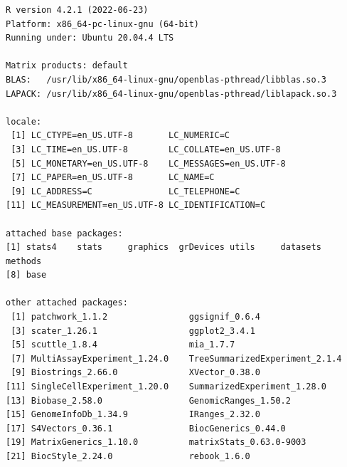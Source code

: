 \documentclass[
]{book}
\begin{document}
\begin{verbatim}
R version 4.2.1 (2022-06-23)
Platform: x86_64-pc-linux-gnu (64-bit)
Running under: Ubuntu 20.04.4 LTS

Matrix products: default
BLAS:   /usr/lib/x86_64-linux-gnu/openblas-pthread/libblas.so.3
LAPACK: /usr/lib/x86_64-linux-gnu/openblas-pthread/liblapack.so.3

locale:
 [1] LC_CTYPE=en_US.UTF-8       LC_NUMERIC=C              
 [3] LC_TIME=en_US.UTF-8        LC_COLLATE=en_US.UTF-8    
 [5] LC_MONETARY=en_US.UTF-8    LC_MESSAGES=en_US.UTF-8   
 [7] LC_PAPER=en_US.UTF-8       LC_NAME=C                 
 [9] LC_ADDRESS=C               LC_TELEPHONE=C            
[11] LC_MEASUREMENT=en_US.UTF-8 LC_IDENTIFICATION=C       

attached base packages:
[1] stats4    stats     graphics  grDevices utils     datasets  methods  
[8] base     

other attached packages:
 [1] patchwork_1.1.2                ggsignif_0.6.4                
 [3] scater_1.26.1                  ggplot2_3.4.1                 
 [5] scuttle_1.8.4                  mia_1.7.7                     
 [7] MultiAssayExperiment_1.24.0    TreeSummarizedExperiment_2.1.4
 [9] Biostrings_2.66.0              XVector_0.38.0                
[11] SingleCellExperiment_1.20.0    SummarizedExperiment_1.28.0   
[13] Biobase_2.58.0                 GenomicRanges_1.50.2          
[15] GenomeInfoDb_1.34.9            IRanges_2.32.0                
[17] S4Vectors_0.36.1               BiocGenerics_0.44.0           
[19] MatrixGenerics_1.10.0          matrixStats_0.63.0-9003       
[21] BiocStyle_2.24.0               rebook_1.6.0                  


\end{verbatim}
\end{document}
